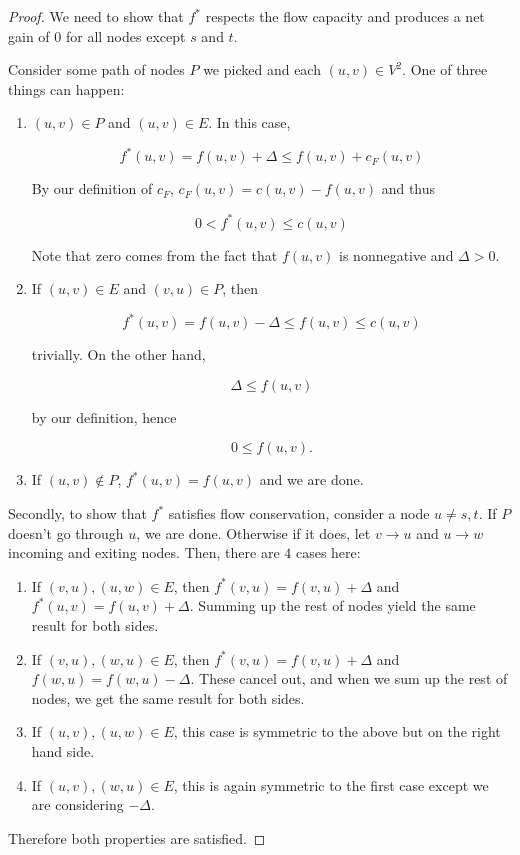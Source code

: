 \begin{proof}
    We need to show that $f^*$ respects the flow capacity and produces a net gain of $0$ for all nodes except $s$ and $t$. 

    Consider some path of nodes $P$ we picked and each $(u,v)\in V^2$. 
    One of three things can happen:

    \begin{enumerate}
        \item $(u,v)\in P$ and $(u,v) \in E$. In this case, 

        \[
            f^*(u,v)=f(u,v)+\Delta \le f(u,v)+c_F(u,v)
        \]

        By our definition of $c_F$, $c_F(u,v)=c(u,v)-f(u,v)$ and thus 

        \[
            0 < f^*(u,v) \le c(u,v)
        \]

        Note that zero comes from the fact that $f(u,v)$ is nonnegative and $\Delta>0$. 

        \item If $(u,v)\in E$ and $(v,u) \in P$, then 
        
        \[
            f^*(u,v)=f(u,v)-\Delta \le f(u,v) \le c(u,v)
        \]

        trivially. On the other hand, 

        \[
            \Delta \le f(u,v)
        \]

        by our definition, hence 

        \[
            0\le f(u,v).
        \]

        \item If $(u,v)\notin P$, $f^*(u,v)=f(u,v)$ and we are done. 
    \end{enumerate}

    Secondly, to show that $f^*$ satisfies flow conservation, consider a node $u\neq s,t$.
    If $P$ doesn't go through $u$, we are done.
    Otherwise if it does, let $v\to u$ and $u\to w$ incoming and exiting nodes.
    Then, there are $4$ cases here:

    \begin{enumerate}
        \item If $(v,u), (u,w) \in E$, then $f^*(v,u)= f(v,u)+\Delta$ and $f^*(u,v)=f(u,v)+\Delta$. Summing up the rest of nodes yield the same result for both sides.
        \item If $(v,u), (w,u) \in E$, then $f^*(v,u)=f(v,u)+\Delta$ and $f(w,u)=f(w,u)-\Delta$. These cancel out, and when we sum up the rest of nodes, we get the same result for both sides.
        \item If $(u,v),(u,w) \in E$, this case is symmetric to the above but on the right hand side.
        \item If $(u,v), (w,u) \in E$, this is again symmetric to the first case except we are considering $-\Delta$. 
    \end{enumerate}

    Therefore both properties are satisfied. 
\end{proof}

